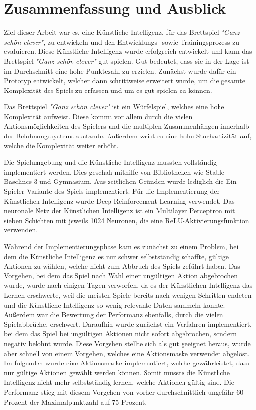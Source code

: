 \section{Zusammenfassung und Ausblick}
Ziel dieser Arbeit war es, eine Künstliche Intelligenz, für das Brettspiel \textit{"Ganz schön clever"}, zu entwickeln und den Entwicklungs- sowie Trainingsprozess zu evaluieren.
Diese Künstliche Intelligenz wurde erfolgreich entwickelt und kann das Brettspiel \textit{"Ganz schön clever"} gut spielen. Gut bedeutet, dass sie in der Lage ist im Durchschnitt eine hohe Punktezahl zu erzielen. Zunächst wurde dafür ein Prototyp entwickelt, welcher dann schrittweise erweitert wurde, um die gesamte Komplexität des Spiels zu erfassen und um es gut spielen zu können.

Das Brettspiel \textit{"Ganz schön clever"} ist ein Würfelspiel, welches eine hohe Komplexität aufweist. Diese kommt vor allem durch die vielen Aktionsmöglichkeiten des Spielers und die multiplen Zusammenhängen innerhalb des Belohnungssystems zustande. Außerdem weist es eine hohe Stochastizität auf, welche die Komplexität weiter erhöht.


Die Spielumgebung und die Künstliche Intelligenz mussten vollständig implementiert werden. Dies geschah mithilfe von Bibliotheken wie Stable Baselines 3 und Gymnasium. Aus zeitlichen Gründen wurde lediglich die Ein-Spieler-Variante des Spiels implementiert. Für die Implementierung der Künstlichen Intelligenz wurde Deep Reinforcement Learning verwendet. Das neuronale Netz der Künstlichen Intelligenz ist ein Multilayer Perceptron mit sieben Schichten mit jeweils 1024 Neuronen, die eine ReLU-Aktivierungsfunktion verwenden.

Während der Implementierungsphase kam es zunächst zu einem Problem, bei dem die Künstliche Intelligenz es nur schwer selbstständig schaffte, gültige Aktionen zu wählen, welche nicht zum Abbruch des Spiels geführt haben. Das Vorgehen, bei dem das Spiel nach Wahl einer ungültigen Aktion abgebrochen wurde, wurde nach einigen Tagen verworfen, da es der Künstlichen Intelligenz das Lernen erschwerte, weil die meisten Spiele bereits nach wenigen Schritten endeten und die Künstliche Intelligenz so wenig relevante Daten sammeln konnte. Außerdem war die Bewertung der Performanz ebenfalls, durch die vielen Spielabbrüche, erschwert. Daraufhin wurde zunächst ein Verfahren implementiert, bei dem das Spiel bei ungültigen Aktionen nicht sofort abgebrochen, sondern negativ belohnt wurde. Diese Vorgehen stellte sich als gut geeignet heraus, wurde aber schnell von einem Vorgehen, welches eine Aktionsmaske verwendet abgelöst. Im folgenden wurde eine Aktionsmaske implementiert, welche gewährleistet, dass nur gültige Aktionen gewählt werden können. Somit musste die Künstliche Intelligenz nicht mehr selbstständig lernen, welche Aktionen gültig sind. Die Performanz stieg mit diesem Vorgehen von vorher durchschnittlich ungefähr 60 Prozent der Maximalpunktzahl auf 75 Prozent.

